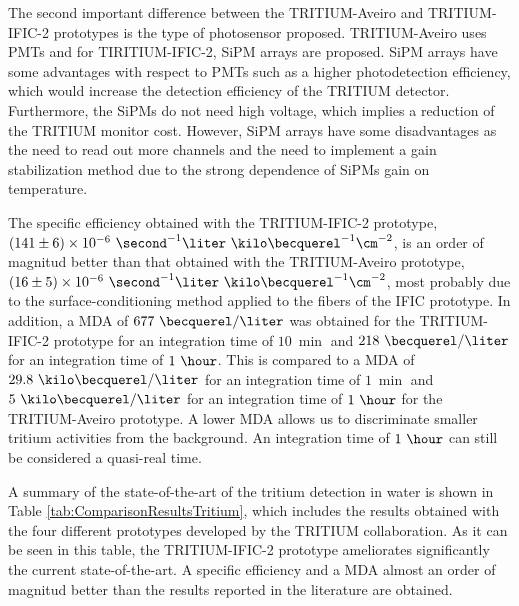 \begin{enumerate}
The second important difference between the TRITIUM-Aveiro and TRITIUM-IFIC-2 prototypes is the type of photosensor proposed. TRITIUM-Aveiro uses PMTs and for TIRITIUM-IFIC-2, SiPM arrays are proposed. SiPM arrays have some advantages with respect to PMTs such as a higher photodetection efficiency, which would increase the detection efficiency of the TRITIUM detector. Furthermore, the SiPMs do not need high voltage, which implies a reduction of the TRITIUM monitor cost. However, SiPM arrays have some disadvantages as the need to read out more channels and the need to implement a gain stabilization method due to the strong dependence of SiPMs gain on temperature.

The specific efficiency obtained with the TRITIUM-IFIC-2 prototype, $(141 \pm 6) \times 10^{-6}~ \second^{-1}  \liter ~ \kilo\becquerel^{-1} \cm^{-2}$, is an order of magnitud better than that obtained with the TRITIUM-Aveiro prototype, $(16 \pm 5)\times 10^{-6}~ \second^{-1}  \liter ~ \kilo\becquerel^{-1} \cm^{-2}$, most probably due to the surface-conditioning method applied to the fibers of the IFIC prototype. In addition, a MDA of $677~\becquerel/\liter$ was obtained for the TRITIUM-IFIC-2 prototype for an integration time of $10~\min$ and $218~\becquerel/\liter$ for an integration time of $1~\hour$. This is compared to a MDA of $29.8~\kilo\becquerel/\liter$ for an integration time of $1~\min$ and $5~\kilo\becquerel/\liter$ for an integration time of $1~\hour$ for the TRITIUM-Aveiro prototype. A lower MDA allows us to discriminate smaller tritium activities from the background. An integration time of $1~\hour$ can still be considered a quasi-real time.

A summary of the state-of-the-art of the tritium detection in water is shown in Table \ref{tab:ComparisonResultsTritium}, which includes the results obtained with the four different prototypes developed by the TRITIUM collaboration. As it can be seen in this table, the TRITIUM-IFIC-2 prototype ameliorates significantly the current state-of-the-art. A specific efficiency and a MDA almost an order of magnitud better than the results reported in the literature are obtained.


\end{enumerate}

